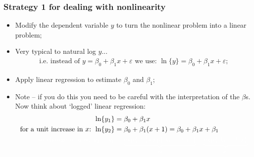 \documentclass[aspectratio=169]{beamer}
\theoremstyle{principle}
\begin{document}
\begin{frame}
\frametitle{Strategy 1 for dealing with nonlinearity}

\begin{itemize}
\item Modify the dependent variable $y$ to turn the nonlinear problem into a linear problem;
\item Very typical to natural log $y$...
\begin{align*}
\mbox{i.e. instead of }y = \beta_0 + \beta_1x + \varepsilon\mbox{ we use: }\ln\{y\} = \beta_0 + \beta_1x + \varepsilon;
\end{align*}
\item Apply linear regression to estimate $\beta_0$ and $\beta_1$;
\item Note -- if you do this you need to be careful with the interpretation of the $\beta$s.  Now think about `logged' linear regression:
\begin{align*}
\ln\{y_1\} &= \beta_0 + \beta_1x\\
\mbox{for a unit increase in $x$: } \ln\{y_2\} &= \beta_0 + \beta_1(x + 1) = \beta_0 + \beta_1x + \beta_1\\
\color{white}\mbox{so change in $y$ is: }y_2 - y_1 &\color{white}= \underbrace{\exp\{\beta_1\}\exp\{\beta_0 + \beta_1x)\}}_{y_2} - \underbrace{\exp\{\beta_0 + \beta_1x\}}_{y_1}
\end{align*}

\end{itemize}

\end{frame}
\end{document}
